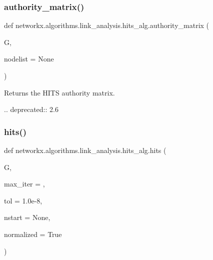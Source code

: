 \subsubsection{\texorpdfstring{authority\+\_\+matrix()}{authority\_matrix()}}
{\footnotesize\ttfamily def networkx.\+algorithms.\+link\+\_\+analysis.\+hits\+\_\+alg.\+authority\+\_\+matrix (\begin{DoxyParamCaption}\item[{}]{G,  }\item[{}]{nodelist = {\ttfamily None} }\end{DoxyParamCaption})}

\begin{DoxyVerb}Returns the HITS authority matrix.

.. deprecated:: 2.6
\end{DoxyVerb}
 \mbox{\label{namespacenetworkx_1_1algorithms_1_1link__analysis_1_1hits__alg_a4a207747e9f9b5fb389523c25415ddc1}} 
\subsubsection{\texorpdfstring{hits()}{hits()}}
{\footnotesize\ttfamily def networkx.\+algorithms.\+link\+\_\+analysis.\+hits\+\_\+alg.\+hits (\begin{DoxyParamCaption}\item[{}]{G,  }\item[{}]{max\+\_\+iter = {},  }\item[{}]{tol = {\ttfamily 1.0e-\/8},  }\item[{}]{nstart = {\ttfamily None},  }\item[{}]{normalized = {\ttfamily True} }\end{DoxyParamCaption})}

